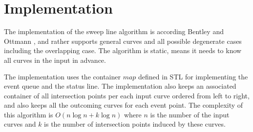 \section{Implementation}

The implementation of the sweep line algorithm is according 
Bentley and Ottmann \cite{}, and rather supports general curves and all 
possible degenerate cases including the overlapping case. 
The algorithm is static, means it needs to know all curves in the input 
in advance. 

The implementation uses the container $map$ defined in STL for
implementing the event queue and the status line. The implementation
also keeps an associated container of all 
intersection points per each input curve ordered from left to right, 
and also keeps all the outcoming curves for each event point. 
The complexity of this algorithm is $O(n\log{n} + k\log{n})$ where $n$ is the 
number of the input curves and $k$ is the number of intersection points induced by these
curves.
